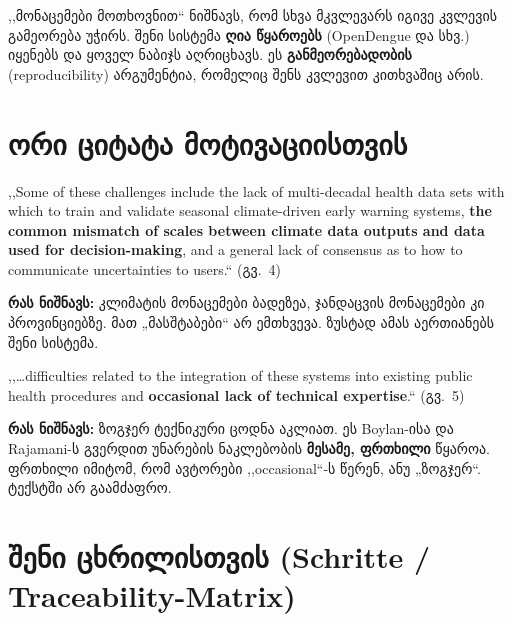 \documentclass[11pt,a4paper]{article}
\newcommand{\q}[1]{,,#1``}
\begin{document}
\begin{mnishvn}
\q{მონაცემები მოთხოვნით} ნიშნავს, რომ სხვა მკვლევარს იგივე კვლევის გამეორება უჭირს. შენი სისტემა
\textbf{ღია წყაროებს} (OpenDengue და სხვ.) იყენებს და ყოველ ნაბიჯს აღრიცხავს. ეს \textbf{განმეორებადობის}
(reproducibility) არგუმენტია, რომელიც შენს კვლევით კითხვაშიც არის.
\end{mnishvn}

\section{ორი ციტატა მოტივაციისთვის}
\begin{citata}
\q{Some of these challenges include the lack of multi-decadal health data sets with which to train and validate
seasonal climate-driven early warning systems, \textbf{the common mismatch of scales between climate data outputs and
data used for decision-making}, and a general lack of consensus as to how to communicate uncertainties to users.}
(გვ.\ 4)
\end{citata}
\noindent \textbf{რას ნიშნავს:} კლიმატის მონაცემები ბადეზეა, ჯანდაცვის მონაცემები კი პროვინციებზე. მათ
„მასშტაბები“ არ ემთხვევა. ზუსტად ამას აერთიანებს შენი სისტემა.

\begin{citata}
\q{\ldots difficulties related to the integration of these systems into existing public health procedures and
\textbf{occasional lack of technical expertise}.} (გვ.\ 5)
\end{citata}
\noindent \textbf{რას ნიშნავს:} ზოგჯერ ტექნიკური ცოდნა აკლიათ. ეს Boylan-ისა და Rajamani-ს გვერდით უნარების
ნაკლებობის \textbf{მესამე, ფრთხილი} წყაროა. ფრთხილი იმიტომ, რომ ავტორები \q{occasional}-ს წერენ, ანუ „ზოგჯერ“.
ტექსტში არ გაამძაფრო.

\section{შენი ცხრილისთვის (Schritte / Traceability-Matrix)}
\end{document}
